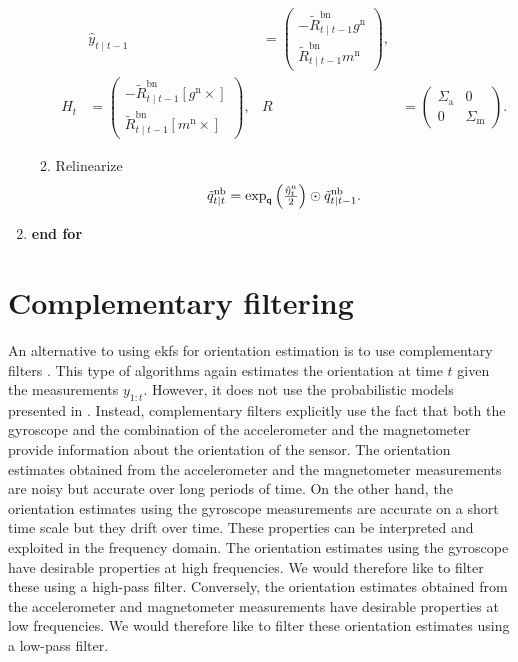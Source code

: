 \begin{algorithm}[ht]
\begin{enumerate}
\begin{enumerate}
\begin{align*}
& \hat{y}_{t \mid t-1} &= \begin{pmatrix} -\tilde{R}^\text{bn}_{t \mid t-1} g^\text{n} \\ \tilde{R}^\text{bn}_{t \mid t-1} m^\text{n} \end{pmatrix}, 
 \\
H_t &= \begin{pmatrix} - \tilde{R}^\text{bn}_{t \mid t-1} [g^\text{n} \times] \\ \tilde{R}^\text{bn}_{t \mid t-1} [m^\text{n} \times]  \end{pmatrix}, & 
R &= \begin{pmatrix} \Sigma_\text{a} & 0 \\ 0 & \Sigma_\text{m} \end{pmatrix}.
\end{align*}
\item Relinearize
\begin{align}
\tilde{q}^\text{nb}_{t \mid t} = \exp_\mathsf{q} \left( \tfrac{\hat{\eta}_t^\text{n}}{2} \right) \odot \tilde{q}^\text{nb}_{t \mid t-1}. 
\end{align}
\end{enumerate}
\item[] \textbf{end for}
\end{enumerate}
\normalsize
\end{algorithm}

\section{Complementary filtering}
\label{sec:oriEst-compl}
An alternative to using \glspl{ekf} for orientation estimation is to use complementary filters \cite{higgins:1975,brown:1972}. This type of algorithms again estimates the orientation at time $t$ given the measurements $y_{1:t}$. However, it does not use the probabilistic models presented in . Instead, complementary filters explicitly use the fact that both the gyroscope and the combination of the accelerometer and the magnetometer provide information about the orientation of the sensor. The orientation estimates obtained from the accelerometer and the magnetometer measurements are noisy but accurate over long periods of time. On the other hand, the orientation estimates using the gyroscope measurements are accurate on a short time scale but they drift over time. These properties can be interpreted and exploited in the frequency domain. The orientation estimates using the gyroscope have desirable properties at high frequencies. We would therefore like to filter these using a high-pass filter. Conversely, the orientation estimates obtained from the accelerometer and magnetometer measurements have desirable properties at low frequencies. We would therefore like to filter these orientation estimates using a low-pass filter. 

